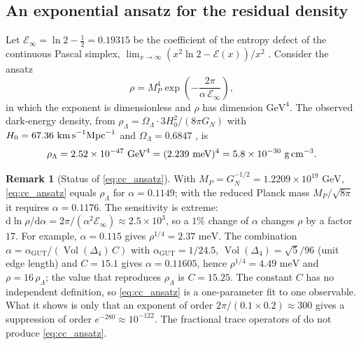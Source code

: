 \documentclass[11pt,reqno]{amsart}
\theoremstyle{definition}
\newtheorem{remark}[theorem]{Remark}
\newcommand{\GUT}{\mathrm{GUT}}
\begin{document}
\subsection{An exponential ansatz for the residual density}
Let $\mathcal{E}_\infty = \ln 2 - \frac12 = 0.19315$ be the coefficient of the entropy defect of the continuous Pascal simplex, $\lim_{x\to\infty}(x^2\ln 2 - \mathcal{E}(x))/x^2$ \cite[Ch.~6]{silvafilho2026book}. Consider the ansatz
\begin{equation}\label{eq:cc_ansatz}
    \rho = M_P^4 \exp\left( - \frac{2\pi}{\alpha\, \mathcal{E}_\infty} \right),
\end{equation}
in which the exponent is dimensionless and $\rho$ has dimension $\text{GeV}^4$. The observed dark-energy density, from $\rho_\Lambda = \Omega_\Lambda \cdot 3H_0^2/(8\pi G_N)$ with $H_0 = 67.36\text{ km\,s}^{-1}\text{Mpc}^{-1}$ and $\Omega_\Lambda = 0.6847$ \cite{planck2018}, is
\begin{equation}
    \rho_\Lambda = 2.52 \times 10^{-47}\text{ GeV}^4 = (2.239\text{ meV})^4 = 5.8 \times 10^{-30}\text{ g\,cm}^{-3}.
\end{equation}

\begin{remark}[Status of \eqref{eq:cc_ansatz}]\label{rem:cc_fit}
With $M_P = G_N^{-1/2} = 1.2209\times10^{19}\text{ GeV}$, \eqref{eq:cc_ansatz} equals $\rho_\Lambda$ for $\alpha = 0.1149$; with the reduced Planck mass $M_P/\sqrt{8\pi}$ it requires $\alpha = 0.1176$. The sensitivity is extreme: $\mathrm{d}\ln\rho/\mathrm{d}\alpha = 2\pi/(\alpha^2\mathcal{E}_\infty) \approx 2.5\times10^{3}$, so a $1\%$ change of $\alpha$ changes $\rho$ by a factor $17$. For example, $\alpha = 0.115$ gives $\rho^{1/4} = 2.37\text{ meV}$. The combination $\alpha = \alpha_{\GUT}/(\operatorname{Vol}(\Delta_4)\, C)$ with $\alpha_{\GUT} = 1/24.5$, $\operatorname{Vol}(\Delta_4) = \sqrt5/96$ (unit edge length) and $C = 15.1$ gives $\alpha = 0.11605$, hence $\rho^{1/4} = 4.49\text{ meV}$ and $\rho = 16\,\rho_\Lambda$; the value that reproduces $\rho_\Lambda$ is $C = 15.25$. The constant $C$ has no independent definition, so \eqref{eq:cc_ansatz} is a one-parameter fit to one observable. What it shows is only that an exponent of order $2\pi/(0.1 \times 0.2) \approx 300$ gives a suppression of order $e^{-280} \approx 10^{-122}$. The fractional trace operators of \cite[Ch.~5]{silvafilho2026book} do not produce \eqref{eq:cc_ansatz}.
\end{remark}

\end{document}
